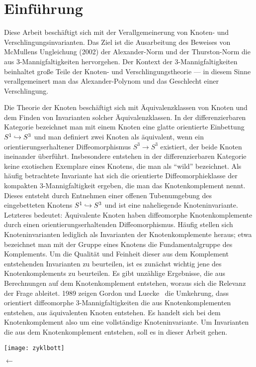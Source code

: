\section{Einführung}
		
	\begin{minipage}[t][\textheight][t]{0.76\textwidth}

	Diese Arbeit beschäftigt sich mit der Verallgemeinerung von Knoten- und Verschlingungsinvarianten. Das Ziel ist die Ausarbeitung des Beweises von McMullens Ungleichung (2002) der Alexander-Norm und der Thurston-Norm die aus 3-Mannigfaltigkeiten hervorgehen. Der Kontext der 3-Mannigfaltigkeiten beinhaltet große Teile der Knoten- und Verschlingungstheorie  --- in diesem Sinne verallgemeinert man das Alexander-Polynom und das Geschlecht einer Verschlingung.

	Die Theorie der Knoten beschäftigt sich mit Äquivalenzklassen von Knoten und dem Finden von Invarianten solcher Äquivalenzklassen. In der differenzierbaren Kategorie bezeichnet man mit einem Knoten eine glatte orientierte Einbettung $S^1\hookrightarrow S^3$ und man definiert zwei Knoten als äquivalent, wenn ein orientierungserhaltener Diffeomorphismus $S^3\to S^3$ existiert, der beide Knoten ineinander überführt. Insbesondere entstehen in der differenzierbaren Kategorie keine exotischen Exemplare eines Knotens, die man als "`wild"' bezeichnet. Als häufig betrachtete Invariante hat sich die orientierte Diffeomorphieklasse der kompakten 3-Mannigfaltigkeit ergeben, die man das Knotenkomplement nennt. Dieses entsteht durch Entnehmen einer offenen Tubenumgebung des eingebetteten Knotens $S^1 \hookrightarrow S^3$ und ist eine naheliegende Knoteninvariante. Letzteres bedeutet: Äquivalente Knoten haben diffeomorphe Knotenkomplemente durch einen orientierungserhaltenden Diffeomorphismus. Häufig stellen sich Knoteninvarianten lediglich als Invarianten der Knotenkomplemente heraus; etwa bezeichnet man mit der Gruppe eines Knotens die Fundamentalgruppe des Komplements. Um die Qualität und Feinheit dieser aus dem Komplement entstehenden Invarianten zu beurteilen, ist es zunächst wichtig jene des Knotenkomplements zu beurteilen. Es gibt unzählige Ergebnisse, die aus Berechnungen auf dem Knotenkomplement entstehen, woraus sich die Relevanz der Frage ableitet. 1989 zeigen Gordon und Luecke~\cite{Gordon.1989} die Umkehrung, dass orientiert diffeomorphe 3-Mannigfaltigkeiten die aus Knotenkomplementen entstehen, aus äquivalenten Knoten entstehen. Es handelt sich bei dem Knotenkomplement also um eine vollständige Knoteninvariante. Um Invarianten die aus dem Knotenkomplement entstehen, soll es in dieser Arbeit gehen.


	\vfill
	\begin{minipage}[t]{0.7\textwidth}
		\texttt{[image: zyklbott]} 
	\end{minipage}
	\begin{minipage}[t]{0.2\textwidth}
	\vspace{-1cm}
	\huge$\longleftarrow$
	\vfill

	\end{minipage}
	\vspace{.63cm}
		 \label{fig:zykl}
	\end{minipage}

